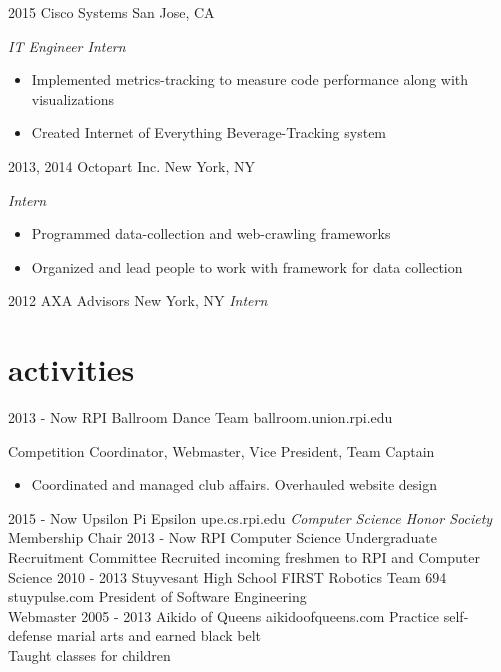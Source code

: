 \documentclass[]{friggeri-cv}
\begin{document}
\begin{entrylist}
  \entry
    {2015}
    {Cisco Systems}
    {San Jose, CA}
    {\emph{IT Engineer Intern}
    \begin{itemize}
        \item Implemented metrics-tracking to measure code performance along with visualizations
        \item Created Internet of Everything Beverage-Tracking system
    \end{itemize}
    }
  \entry
    {2013, 2014}
    {Octopart Inc.}
    {New York, NY}
    {\emph{Intern}
    \begin{itemize}
        \item Programmed data-collection and web-crawling frameworks
        \item Organized and lead people to work with framework for data collection
    \end{itemize}
    }
  \entry
    {2012}
    {AXA Advisors}
    {New York, NY}
    {\emph{Intern}}
\end{entrylist}

\section{activities}

\begin{entrylist}
  \entry
    {2013 - Now}
    {RPI Ballroom Dance Team}
    {ballroom.union.rpi.edu}
    {Competition Coordinator, Webmaster, Vice President, Team Captain
    \begin{itemize}
        \item Coordinated and managed club affairs. Overhauled website design
    \end{itemize}
    }
  \entry
    {2015 - Now}
    {Upsilon Pi Epsilon}
    {upe.cs.rpi.edu}
    {\emph{Computer Science Honor Society}\\
    Membership Chair}
  \entry
    {2013 - Now}
    {RPI Computer Science Undergraduate Recruitment Committee}
    {}
    {Recruited incoming freshmen to RPI and Computer Science}
  \entry
    {2010 - 2013}
    {Stuyvesant High School FIRST Robotics Team 694}
    {stuypulse.com}
    {President of Software Engineering\\
    Webmaster}
  \entry
    {2005 - 2013}
    {Aikido of Queens}
    {aikidoofqueens.com}
    {Practice self-defense marial arts and earned black belt\\
    Taught classes for children}
\end{entrylist}
\end{document}

